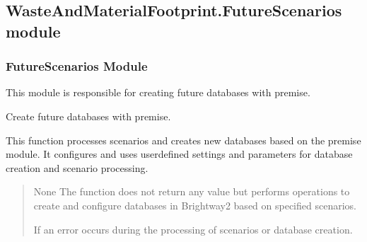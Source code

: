 \documentclass[letterpaper,10pt,english]{sphinxmanual}
\begin{document}
\subsection{WasteAndMaterialFootprint.FutureScenarios module}
\label{\detokenize{WMFootprint_api:module-WasteAndMaterialFootprint.FutureScenarios}}\label{\detokenize{WMFootprint_api:wasteandmaterialfootprint-futurescenarios-module}}

\subsubsection{FutureScenarios Module}
\label{\detokenize{WMFootprint_api:futurescenarios-module}}
\sphinxAtStartPar
This module is responsible for creating future databases with premise.

\begin{fulllineitems}
\label{\detokenize{WMFootprint_api:WasteAndMaterialFootprint.FutureScenarios.FutureScenarios}}
\pysigstartsignatures
{}
\pysigstopsignatures
\sphinxAtStartPar
Create future databases with premise.

\sphinxAtStartPar
This function processes scenarios and creates new databases based on the premise module. It configures and uses user\sphinxhyphen{}defined settings and parameters for database creation and scenario processing.
\begin{quote}\begin{description}
\sphinxAtStartPar
None
The function does not return any value but performs operations to create and configure databases in Brightway2 based on specified scenarios.

\sphinxAtStartPar
{} \textendash{} If an error occurs during the processing of scenarios or database creation.

\end{description}\end{quote}

\end{fulllineitems}
\end{document}
